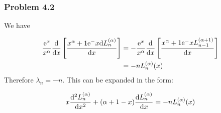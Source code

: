 \documentclass[12pt,landscape]{article}
\def\D{ {\rm d} }
\def\E{ {\rm e} }
\def\dx{\D x}
\def\br[#1]{\left[{#1}\right]}
\begin{document}
{\subsubsection{Problem 4.2}
We have


\begin{align*}
{\E^x \over x^\alpha} {\D \over \dx} \br[x^{\alpha+1} \E^{-x} {\D L_n^{(\alpha)} \over \dx}] &= -{\E^x \over x^\alpha} {\D \over \dx} \br[x^{\alpha+1} \E^{-x} { L_{n-1}^{(\alpha+1)} \over \dx}] \\
&= -n L_{n}^{(\alpha)}(x)
\end{align*}
Therefore $\lambda_n = -n$. This can be expanded in the form:

\[
x {\D^2 L_n^{(\alpha)} \over \dx^2} + (\alpha+1 - x) {\D L_n^{(\alpha)} \over \dx} = -n L_n^{(\alpha)}(x)
\]

}
\end{document}
